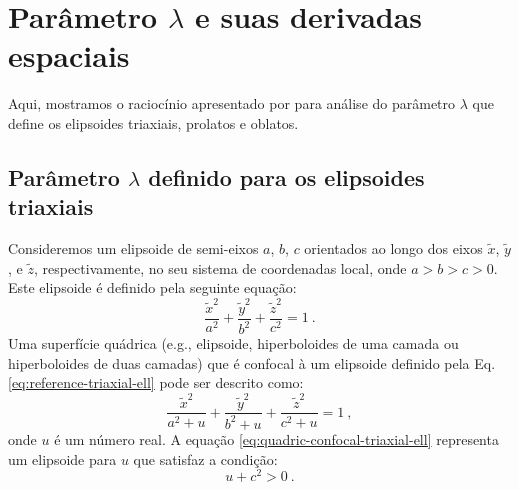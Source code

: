 \chapter{Parâmetro $\lambda$ e suas derivadas espaciais}

Aqui, mostramos o raciocínio apresentado por \citet{webster1904}
para análise do parâmetro $\lambda$ que define os elipsoides triaxiais, prolatos e oblatos.

\section{Parâmetro $\lambda$ definido para os elipsoides triaxiais}

Consideremos um elipsoide de semi-eixos $a$, $b$, $c$ orientados ao longo dos eixos
$\tilde{x}$, $\tilde{y}$, e $\tilde{z}$, respectivamente, no seu sistema de coordenadas
local, onde $a > b > c > 0$. Este elipsoide é definido pela seguinte equação:
\begin{equation}
\frac{\tilde{x}^{2}}{a^{2}} + \frac{\tilde{y}^{2}}{b^{2}} + \frac{\tilde{z}^{2}}{c^{2}} = 1 \: .
\label{eq:reference-triaxial-ell}
\end{equation}
Uma superfície quádrica (e.g., elipsoide, hiperboloides de uma camada ou 
hiperboloides de duas camadas) que é confocal à um elipsoide definido pela
Eq. \ref{eq:reference-triaxial-ell} pode ser descrito como:
\begin{equation}
\frac{\tilde{x}^{2}}{a^{2} + u} + \frac{\tilde{y}^{2}}{b^{2} + u} + \frac{\tilde{z}^{2}}{c^{2} + u} = 1 \: ,
\label{eq:quadric-confocal-triaxial-ell}
\end{equation}
onde $u$ é um número real. A equação \ref{eq:quadric-confocal-triaxial-ell}
representa um elipsoide para $u$ que satisfaz a condição:
\begin{equation}
u + c^{2} > 0 \: .
\label{eq:condition-triaxial-ell}
\end{equation}

